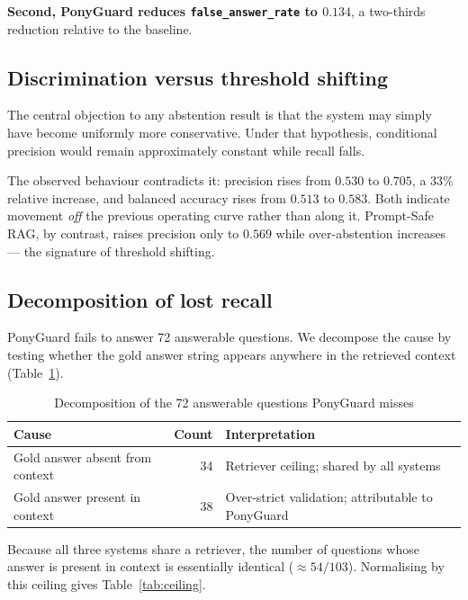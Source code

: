 \documentclass[conference]{IEEEtran}
\begin{document}
\textbf{Second, PonyGuard reduces \texttt{false\_answer\_rate} to $0.134$}, a
two-thirds reduction relative to the baseline.

\subsection{Discrimination versus threshold shifting}
\label{sec:discrimination}

The central objection to any abstention result is that the system may simply have
become uniformly more conservative. Under that hypothesis, conditional precision
would remain approximately constant while recall falls.

The observed behaviour contradicts it: precision rises from $0.530$ to $0.705$, a
$33\%$ relative increase, and balanced accuracy rises from $0.513$ to $0.583$.
Both indicate movement \emph{off} the previous operating curve rather than along
it. Prompt-Safe RAG, by contrast, raises precision only to $0.569$ while
over-abstention increases --- the signature of threshold shifting.

\subsection{Decomposition of lost recall}
\label{sec:recall-decomp}

PonyGuard fails to answer 72 answerable questions. We decompose the cause by
testing whether the gold answer string appears anywhere in the retrieved context
(Table~\ref{tab:decomp}).

\begin{table}[t]
\caption{Decomposition of the 72 answerable questions PonyGuard misses}
\label{tab:decomp}
\centering
\footnotesize
\begin{tabular}{@{}lrp{3.2cm}@{}}
\toprule
Cause & Count & Interpretation \\
\midrule
Gold answer absent from context  & 34 & Retriever ceiling; shared by all systems \\
Gold answer present in context   & 38 & Over-strict validation; attributable to PonyGuard \\
\bottomrule
\end{tabular}
\end{table}

Because all three systems share a retriever, the number of questions whose answer
is present in context is essentially identical ($\approx 54/103$). Normalising by
this ceiling gives Table~\ref{tab:ceiling}.
\end{document}
